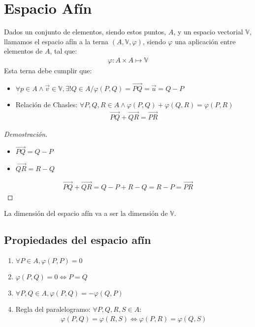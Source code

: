 \documentclass{../Geometria.tex}
\begin{document}
\pagebreak
\section{Espacio Afín}
\begin{defin}
	Dados un conjunto de elementos, siendo estos puntos, $A$, y un espacio
	vectorial $\mathbb{V}$, llamamos el espacio afín a la terna $(A,\mathbb{V},
	\varphi)$, siendo $\varphi$ una aplicación entre elementos de $A$, tal que:
	\begin{equation}
		\begin{split}
			\varphi: A \times A \mapsto \mathbb{V}
		\end{split}
	\end{equation}
	Esta terna debe cumplir que:
	\begin{itemize}
		\item $\forall p \in A \wedge \vec{v} \in \mathbb{V}, \exists! Q \in A
			 / \varphi(P,Q) = \vec{PQ}=\vec{u}=Q-P$
		\item Relación de Chasles: $\forall P,Q,R \in A \wedge
			\varphi (P,Q) + \varphi (Q,R) = \varphi (P,R)$
			\begin{equation}
				\begin{split}
					\vec{PQ} + \vec{QR} = \vec{PR}
				\end{split}
			\end{equation}
	\end{itemize}
	\begin{proof}[Demostración]
		\begin{itemize}
			\item $\vec{PQ}=Q-P$
			\item $\vec{QR}=R-Q$ 
		\end{itemize}
		\begin{equation}
			\begin{split}
				\vec{PQ}+\vec{QR} = Q-P +R-Q = R-P = \vec{PR} 
			\end{split}
		\end{equation}
	\end{proof}
	La dimensión del espacio afín va a ser la dimensión de $\mathbb{V}$. 
\end{defin}
\subsection{Propiedades del espacio afín}
\begin{enumerate}
	\item $\forall P \in A, \varphi(P,P)=0$
	\item $\varphi(P,Q)=0 \iff P=Q$
	\item $\forall P,Q \in A, \varphi(P,Q) = -\varphi(Q,P)$
	\item Regla del paralelogramo: $\forall P,Q,R,S \in A$:
		\begin{equation}
			\begin{split}
				\varphi(P,Q)=\varphi(R,S) \iff \varphi (P,R) = \varphi (Q,S)
			\end{split}
		\end{equation}
\end{enumerate}
\end{document}
